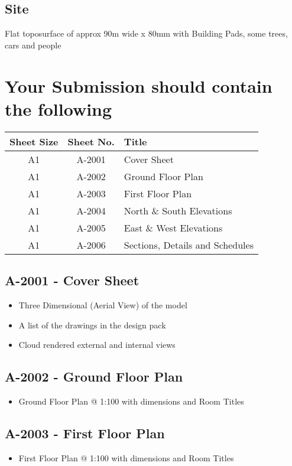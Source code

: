 \subsection*{Site}
Flat toposurface of approx 90m wide x 80mm with Building Pads, some trees, cars and people




\newpage
\section*{Your Submission should contain the following}


\begin{tabularx}{\textwidth}{ |c|c|X| }
	\hline
	\textbf{Sheet Size} & \textbf{Sheet No.} & \textbf{Title} \\
	\hline 
	A1  & A-2001 & Cover Sheet \\
	A1  & A-2002 & Ground Floor Plan \\
	A1  & A-2003 & First Floor Plan \\
	A1  & A-2004 & North \& South Elevations \\
	A1  & A-2005 & East \& West Elevations \\
	A1  & A-2006 & Sections, Details and Schedules \\
	\hline
\end{tabularx}


\subsection*{A-2001 - Cover Sheet}
\begin{itemize}
	\item Three Dimensional (Aerial View) of the model
	\item A list of the drawings in the design pack
	\item Cloud rendered external and internal views
\end{itemize}


\subsection*{A-2002 - Ground Floor Plan}
\begin{itemize}
	\item Ground Floor Plan @ 1:100 with dimensions and Room Titles
\end{itemize}


\subsection*{A-2003 - First Floor Plan}
\begin{itemize}
	\item First Floor Plan @ 1:100 with dimensions and Room Titles
\end{itemize}



